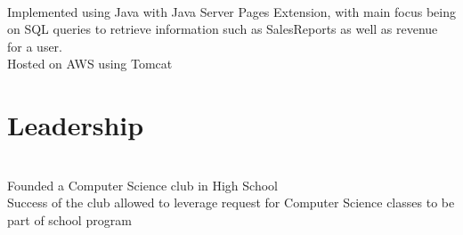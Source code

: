 \documentclass[]{Resume}
\begin{document}
\begin{minipage}[t]{0.66\textwidth}
\sectionsep

 \\
\textbullet{} Implemented using Java with Java Server Pages Extension, with main focus being on SQL queries to retrieve information such as SalesReports as well as revenue for a user. \\
\textbullet{} Hosted on AWS using Tomcat

\sectionsep


\section{Leadership}
 \\
\textbullet{} Founded a Computer Science club in High School \\
\textbullet{} Success of the club allowed to leverage request for Computer Science classes to be part of school program 
\sectionsep

\end{minipage} 
\end{document}
